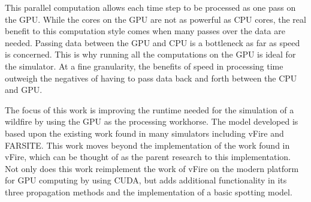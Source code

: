 This parallel computation allows each time step to be processed as one pass on the GPU. While the cores on the GPU are not as powerful as CPU cores, the real benefit to this computation style comes when many passes over the data are needed. Passing data between the GPU and CPU is a bottleneck as far as speed is concerned. This is why running all the computations on the GPU is ideal for the simulator. At a fine granularity, the benefits of speed in processing time outweigh the negatives of having to pass data back and forth between the CPU and GPU.

The focus of this work is improving the runtime needed for the simulation of a wildfire by using the GPU as the processing workhorse. The model developed is based upon the existing work found in many simulators including vFire and FARSITE. This work moves beyond the implementation of the work found in vFire, which can be thought of as the parent research to this implementation. Not only does this work reimplement the work of vFire on the modern platform for GPU computing by using CUDA, but adds additional functionality in its three propagation methods and the implementation of a basic spotting model. 


